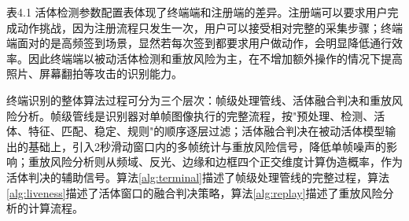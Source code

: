 \documentclass[UTF8]{heuthesis}
\begin{document}
表4.1 活体检测参数配置表体现了终端端和注册端的差异。注册端可以要求用户完成动作挑战，因为注册流程只发生一次，用户可以接受相对完整的采集步骤；终端端面对的是高频签到场景，显然若每次签到都要求用户做动作，会明显降低通行效率。因此终端端以被动活体检测和重放风险为主，在不增加额外操作的情况下提高照片、屏幕翻拍等攻击的识别能力。

终端识别的整体算法过程可分为三个层次：帧级处理管线、活体融合判决和重放风险分析。帧级管线是识别器对单帧图像执行的完整流程，按"预处理、检测、活体、特征、匹配、稳定、规则"的顺序逐层过滤；活体融合判决在被动活体模型输出的基础上，引入2秒滑动窗口内的多帧统计与重放风险信号，降低单帧噪声的影响；重放风险分析则从频域、反光、边缘和边框四个正交维度计算伪造概率，作为活体判决的辅助信号。算法\ref{alg:terminal}描述了帧级处理管线的完整过程，算法\ref{alg:liveness}描述了活体窗口的融合判决策略，算法\ref{alg:replay}描述了重放风险分析的计算流程。

\makeatletter
{}
\makeatother
\end{document}
